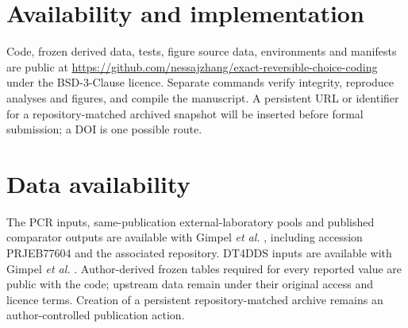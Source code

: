 \documentclass[10pt]{article}
\begin{document}
\section*{Availability and implementation}

Code, frozen derived data, tests, figure source data, environments and manifests are public at \url{https://github.com/nessajzhang/exact-reversible-choice-coding} under the BSD-3-Clause licence. Separate commands verify integrity, reproduce analyses and figures, and compile the manuscript. A persistent URL or identifier for a repository-matched archived snapshot will be inserted before formal submission; a DOI is one possible route.

\section*{Data availability}

The PCR inputs, same-publication external-laboratory pools and published comparator outputs are available with Gimpel \emph{et al.} \cite{gimpel2025pcrbias}, including accession PRJEB77604 and the associated repository. DT4DDS inputs are available with Gimpel \emph{et al.} \cite{gimpel2023digitaltwin}. Author-derived frozen tables required for every reported value are public with the code; upstream data remain under their original access and licence terms. Creation of a persistent repository-matched archive remains an author-controlled publication action.

\begingroup
\footnotesize


\endgroup
\end{document}
